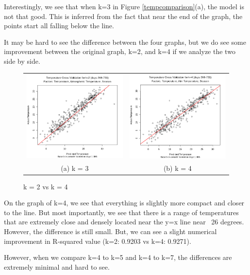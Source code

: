 \documentclass[12pt]{article}
\begin{document}
Interestingly, we see that when k=3 in Figure \ref{tempcomparison}(a), the model is not that good. This is inferred from the fact that near the end of the graph, the points start all falling below the line.

It may be hard to see the difference between the four graphs, but we do see some improvement between the original graph, k=2, and k=4 if we analyze the two side by side.
\begin{figure}[H]
\begin{tabular}{cc}
  \includegraphics[width=.5\linewidth]{tempxvalidk=2.png} &   \includegraphics[width=.5\linewidth]{tempxvalidk=4.png} \\
(a) k = 3 & (b) k = 4 \\[6pt]
\end{tabular}
\caption{k = 2 vs k = 4}
\end{figure}

On the graph of k=4, we see that everything is slightly more compact and closer to the line. But most importantly, we see that there is a range of temperatures that are extremely close and densely located near the y=x line near ~26 degrees. However, the difference is still small. But, we can see a slight numerical improvement in R-squared value (k=2: 0.9203 vs k=4: 0.9271). 

However, when we compare k=4 to k=5 and k=4 to k=7, the differences are extremely minimal and hard to see.
\end{document}
